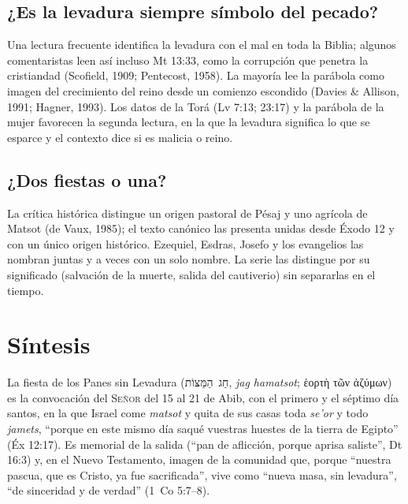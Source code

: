 \documentclass[11pt,letterpaper]{article}
\newcommand{\heb}[1]{\mbox{\foreignlanguage{hebrew}{#1}}}
\newcommand{\grc}[1]{\foreignlanguage{ancientgreek}{#1}}
\newcommand{\SENOR}{\textsc{Señor}}
\begin{document}
\subsection{¿Es la levadura siempre símbolo del pecado?}
Una lectura frecuente identifica la levadura con el mal en toda la Biblia; algunos comentaristas leen así incluso Mt 13:33, como la corrupción que penetra la cristiandad (Scofield, 1909; Pentecost, 1958). La mayoría lee la parábola como imagen del crecimiento del reino desde un comienzo escondido (Davies \& Allison, 1991; Hagner, 1993). Los datos de la Torá (Lv 7:13; 23:17) y la parábola de la mujer favorecen la segunda lectura, en la que la levadura significa lo que se esparce y el contexto dice si es malicia o reino.

\subsection{¿Dos fiestas o una?}
La crítica histórica distingue un origen pastoral de Pésaj y uno agrícola de Matsot (de Vaux, 1985); el texto canónico las presenta unidas desde Éxodo 12 y con un único origen histórico. Ezequiel, Esdras, Josefo y los evangelios las nombran juntas y a veces con un solo nombre. La serie las distingue por su significado (salvación de la muerte, salida del cautiverio) sin separarlas en el tiempo.

\section{Síntesis}

\begin{tcolorbox}[enhanced,unbreakable,colback=papiro,colframe=tierraroja,boxrule=1pt,arc=3pt,title={Definición},fonttitle=\bfseries,coltitle=papiro,colbacktitle=tierraroja]
La fiesta de los Panes sin Levadura (\heb{חַג הַמַּצּוֹת}, \emph{jag hamatsot}; \grc{ἑορτὴ τῶν ἀζύμων}) es la convocación del \SENOR{} del 15 al 21 de Abib, con el primero y el séptimo día santos, en la que Israel come \emph{matsot} y quita de sus casas toda \emph{se'or} y todo \emph{jamets}, ``porque en este mismo día saqué vuestras huestes de la tierra de Egipto'' (Éx 12:17). Es memorial de la salida (``pan de aflicción, porque aprisa saliste'', Dt 16:3) y, en el Nuevo Testamento, imagen de la comunidad que, porque ``nuestra pascua, que es Cristo, ya fue sacrificada'', vive como ``nueva masa, sin levadura'', ``de sinceridad y de verdad'' (1~Co 5:7--8).
\end{tcolorbox}
\end{document}
